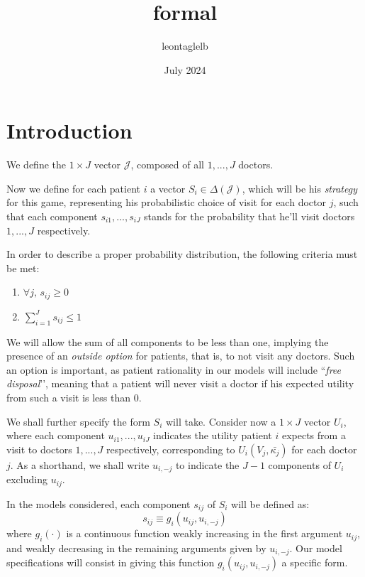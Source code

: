 \documentclass{article}
\title{formal}
\author{leontaglelb }
\date{July 2024}
\begin{document}
\maketitle

\section{Introduction}


We define the $1 \times J$ vector $\mathcal{J}$, composed of all $1, ..., J$ doctors.

Now we define for each patient $i$ a vector $S_i \in \Delta(\mathcal{J})$, which will be his \textit{strategy} for this game, representing his probabilistic choice of visit for each doctor $j$, such that each component $s_{i1}, ... , s_{iJ}$ stands for the probability that he’ll visit doctors $1, ..., J$ respectively.

In order to describe a proper probability distribution, the following criteria must be met:


\begin{enumerate}[label=\roman*.]
    \item $\forall j, \, s_{ij} \geq 0$
    \item $\sum_{i = 1}^{J} s_{ij} \leq 1$
\end{enumerate}

We will allow the sum of all components to be less than one, implying the presence of an \textit{outside option} for patients, that is, to not visit any doctors. Such an option is important, as patient rationality in our models will include  ``\textit{free disposal}’’, meaning that a patient will never visit a doctor if his expected utility from such a visit is less than $0$.

We shall further specify the form $S_i$ will take. Consider now a $1 \times J$ vector $U_i$, where each component $u_{i1}, ... , u_{iJ}$ indicates the utility patient $i$ expects from a visit to doctors $1, ..., J$ respectively, corresponding to $U_i(V_j, \bar{\kappa_j})$ for each doctor $j$. As a shorthand, we shall write $u_{i,-j}$ to indicate the $J - 1$ components of $U_i$ excluding $u_{ij}$.

In the models considered, each component $s_{ij}$ of $S_i$ will be defined as:
\[s_{ij} \equiv g_i(u_{ij}, u_{i,-j})\]
where $g_i(\cdot)$ is a continuous function weakly increasing in the first argument $u_{ij}$, and weakly decreasing in the remaining arguments given by $u_{i,-j}$. Our model specifications will consist in giving this function $g_i(u_{ij}, u_{i,-j})$ a specific form.
\end{document}
